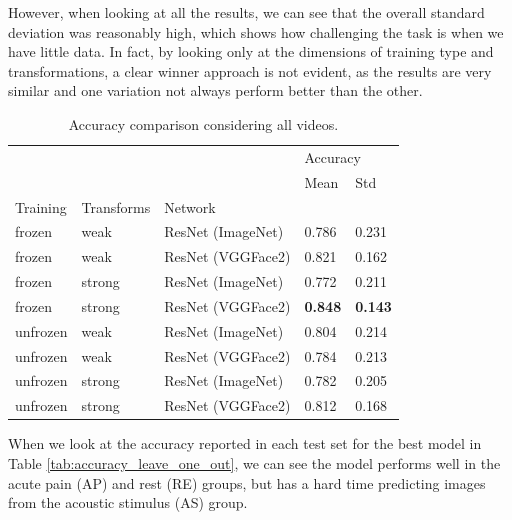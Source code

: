However, when looking at all the results, we can see that the overall standard deviation was reasonably high, which shows how challenging the task is when we have little data. In fact, by looking only at the dimensions of training type and transformations, a clear winner approach is not evident, as the results are very similar and one variation not always perform better than the other.

\begin{table}[h!tp]
\centering
\caption{Accuracy comparison considering all videos.}
\label{tab:accuracy_all}
\begin{tabular}{lllll}
\toprule
         &        &          & \multicolumn{2}{l}{Accuracy} \\
         &        &          &     Mean &    Std \\
Training & Transforms & Network &          &        \\
\midrule
frozen   & weak   & ResNet (ImageNet) &    0.786 &  0.231 \\
frozen   & weak   & ResNet (VGGFace2) &    0.821 &  0.162 \\
frozen   & strong & ResNet (ImageNet) &    0.772 &  0.211 \\
frozen   & strong & ResNet (VGGFace2) &    \textbf{0.848} & \textbf{ 0.143} \\
unfrozen & weak   & ResNet (ImageNet) &    0.804 &  0.214 \\
unfrozen & weak   & ResNet (VGGFace2) &    0.784 &  0.213 \\
unfrozen & strong & ResNet (ImageNet) &    0.782 &  0.205 \\
unfrozen & strong & ResNet (VGGFace2) &    0.812 &  0.168 \\
\bottomrule
\end{tabular}
\end{table}

When we look at the accuracy reported in each test set for the best model in Table \ref{tab:accuracy_leave_one_out}, we can see the model performs well in the acute pain (AP) and rest (RE) groups, but has a hard time predicting images from the acoustic stimulus (AS) group.

